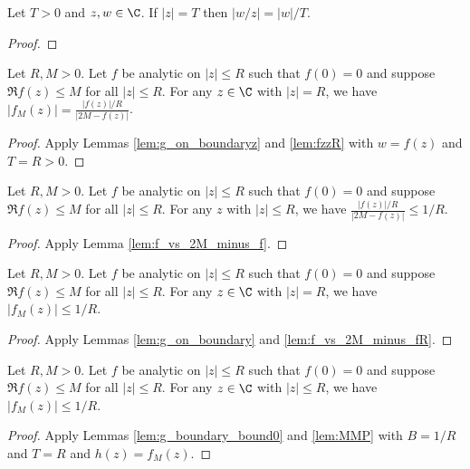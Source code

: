 \begin{lemma} \label{lem:fzzR}  \leanok
Let $T>0$ and $z,w\in\C$. If $|z|=T$ then $|w/z| = |w|/T$.
\end{lemma}
\begin{proof} \leanok
\end{proof}


\begin{lemma}[Boundary g]\label{lem:g_on_boundary}  \leanok
Let $R,M>0$. Let $f$ be analytic on $|z| \le R$ such that $f(0)=0$ and suppose $\Re f(z) \le M$ for all $|z| \le R$.  For any $z\in\C$ with $|z|=R$, we have $|f_M(z)| = \frac{|f(z)|/R}{|2M - f(z)|}$.
\end{lemma}
\begin{proof} \leanok
{}
Apply Lemmas \ref{lem:g_on_boundaryz} and \ref{lem:fzzR} with $w=f(z)$ and $T=R>0$.
\end{proof}

\begin{lemma}\label{lem:f_vs_2M_minus_fR}  \leanok
Let $R,M>0$. Let $f$ be analytic on $|z| \le R$ such that $f(0)=0$ and suppose $\Re f(z) \le M$ for all $|z| \le R$. For any $z$ with $|z| \le R$, we have $ \frac{|f(z)|/R}{|2M - f(z)|}\le 1/R$.
\end{lemma}
\begin{proof} \leanok
{}
Apply Lemma \ref{lem:f_vs_2M_minus_f}.
\end{proof}

\begin{lemma}\label{lem:g_boundary_bound0}  \leanok
Let $R,M>0$. Let $f$ be analytic on $|z| \le R$ such that $f(0)=0$ and suppose $\Re f(z) \le M$ for all $|z| \le R$. For any $z\in\C$ with $|z|=R$, we have $|f_M(z)| \le 1/R$.
\end{lemma}
\begin{proof} \leanok
{}
Apply Lemmas \ref{lem:g_on_boundary} and \ref{lem:f_vs_2M_minus_fR}.
\end{proof}


\begin{lemma}\label{lem:g_interior_bound}  \leanok
Let $R,M>0$. Let $f$ be analytic on $|z| \le R$ such that $f(0)=0$ and suppose $\Re f(z) \le M$ for all $|z| \le R$. For any $z\in\C$ with $|z| \le R$, we have $|f_M(z)| \le 1/R$.
\end{lemma}
\begin{proof} \leanok
{}
Apply Lemmas \ref{lem:g_boundary_bound0} and \ref{lem:MMP} with $B=1/R$ and $T=R$ and $h(z)=f_M(z)$.
\end{proof}

